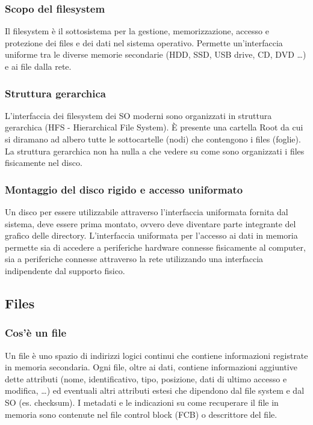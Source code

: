 \documentclass[a4paper]{article}
\begin{document}
\subsubsection*{Scopo del filesystem}
Il filesystem è il sottosistema per la gestione, memorizzazione, accesso e protezione dei files e dei dati nel sistema operativo.
Permette un'interfaccia uniforme tra le diverse memorie secondarie (HDD, SSD, USB drive, CD, DVD \dots) e ai file dalla rete.

\subsubsection*{Struttura gerarchica}
L'interfaccia dei filesystem dei SO moderni sono organizzati in struttura gerarchica (HFS - Hierarchical File System). È presente
una cartella Root da cui si diramano ad albero tutte le sottocartelle (nodi) che contengono i files (foglie). La struttura
gerarchica non ha nulla a che vedere su come sono organizzati i files fisicamente nel disco.

\subsubsection*{Montaggio del disco rigido e accesso uniformato}
Un disco per essere utilizzabile attraverso l'interfaccia uniformata fornita dal sistema, deve essere prima montato, ovvero
deve diventare parte integrante del grafico delle directory. L'interfaccia uniformata per l'accesso ai dati in memoria permette
sia di accedere a periferiche hardware connesse fisicamente al computer, sia a periferiche connesse attraverso la rete utilizzando
una interfaccia indipendente dal supporto fisico.


\subsection{Files}
\subsubsection*{Cos'è un file}
Un file è uno spazio di indirizzi logici continui che contiene informazioni registrate in memoria secondaria. Ogni file, oltre
ai dati, contiene informazioni aggiuntive dette attributi (nome, identificativo, tipo, posizione, dati di ultimo accesso e
modifica, \dots) ed eventuali altri attributi estesi che dipendono dal file system e dal SO (es. checksum). I metadati e le
indicazioni su come recuperare il file in memoria sono contenute nel file control block (FCB) o descrittore del file.
\end{document}
